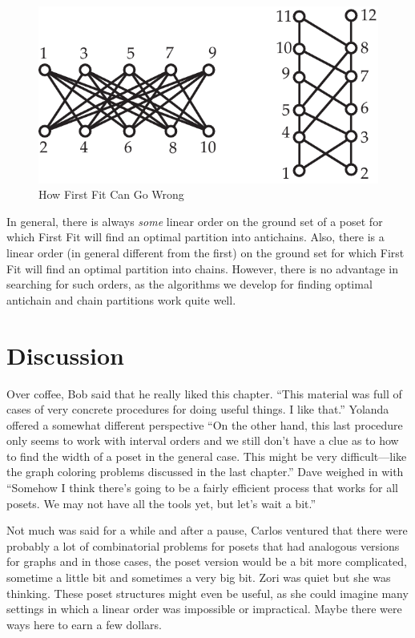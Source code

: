 \begin{figure}
\begin{center}
\includegraphics*[scale=.4]{posets-figs/FirstFit.pdf}
\caption{How First Fit Can Go Wrong}
\label{fig:FirstFit} 
\end{center}
\end{figure}

In general, there is always \textit{some} linear order on the ground set 
of a poset for which First Fit will find an optimal partition into antichains.  
Also, there is a linear order (in general different from the first) on the ground 
set for which First Fit will find an optimal partition into chains.
However, there is no advantage in searching for such orders, as the algorithms
we develop for finding optimal antichain and chain partitions work quite well.

\section{Discussion}\label{s:posets:discussion}

Over coffee, Bob said that he really liked this chapter.  ``This
material was full of cases of very concrete procedures for doing
useful things.  I like that.''  Yolanda offered a somewhat different
perspective ``On the other hand, this last procedure only seems
to work with interval orders and we still don't have a clue as to
how to find the width of a poset in the general case.  This might
be very difficult---like the graph coloring problems discussed in
the last chapter.''  Dave weighed in with ``Somehow I think there's
going to be a fairly efficient process that works for all posets.
We may not have all the tools yet, but let's wait a bit.''

Not much was said for a while and after a pause, Carlos ventured
that there were probably a lot of combinatorial problems for
posets that had analogous versions for graphs and in those cases,
the poset version would be a bit more complicated, sometime a little
bit and sometimes a very big bit.
Zori was quiet but she was thinking.  These poset structures might
even be useful, as she could imagine many settings in which a
linear order was impossible or impractical.  Maybe there were ways
here to earn a few dollars.


